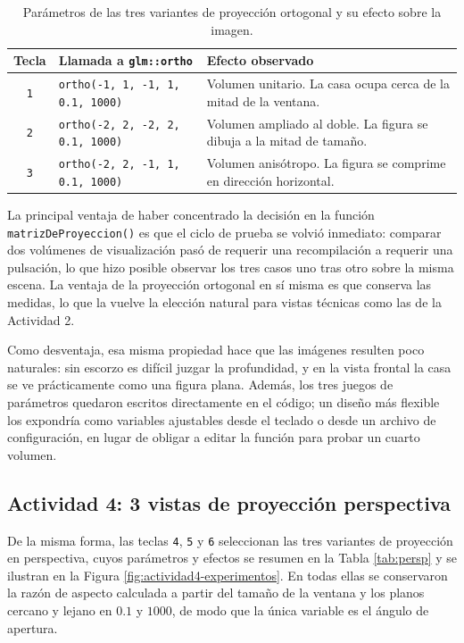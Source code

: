 \begin{table}[H]
\centering
\begin{tabular}{@{}cp{7.2cm}p{5.6cm}@{}}
\toprule
\textbf{Tecla} & \textbf{Llamada a \texttt{glm::ortho}} & \textbf{Efecto observado} \\
\midrule
\texttt{1} & \texttt{ortho(-1, 1, -1, 1, 0.1, 1000)}  & Volumen unitario. La casa ocupa cerca de la mitad de la ventana. \\
\texttt{2} & \texttt{ortho(-2, 2, -2, 2, 0.1, 1000)}  & Volumen ampliado al doble. La figura se dibuja a la mitad de tamaño. \\
\texttt{3} & \texttt{ortho(-2, 2, -1, 1, 0.1, 1000)}  & Volumen anisótropo. La figura se comprime en dirección horizontal. \\
\bottomrule
\end{tabular}
\caption{Parámetros de las tres variantes de proyección ortogonal y su efecto sobre la imagen.}
\label{tab:ortho}
\end{table}

La principal ventaja de haber concentrado la decisión en la función
\texttt{matrizDeProyeccion()} es que el ciclo de prueba se volvió inmediato:
comparar dos volúmenes de visualización pasó de requerir una recompilación a
requerir una pulsación, lo que hizo posible observar los tres casos uno tras
otro sobre la misma escena. La ventaja de la proyección ortogonal en sí misma
es que conserva las medidas, lo que la vuelve la elección natural para vistas
técnicas como las de la Actividad 2.

Como desventaja, esa misma propiedad hace que las imágenes resulten poco
naturales: sin escorzo es difícil juzgar la profundidad, y en la vista frontal
la casa se ve prácticamente como una figura plana. Además, los tres juegos de
parámetros quedaron escritos directamente en el código; un diseño más flexible
los expondría como variables ajustables desde el teclado o desde un archivo de
configuración, en lugar de obligar a editar la función para probar un cuarto
volumen.

\subsection{Actividad 4: 3 vistas de proyección perspectiva}
De la misma forma, las teclas \texttt{4}, \texttt{5} y \texttt{6} seleccionan
las tres variantes de proyección en perspectiva, cuyos parámetros y efectos se
resumen en la Tabla \ref{tab:persp} y se ilustran en la Figura
\ref{fig:actividad4-experimentos}. En todas ellas se conservaron la razón de
aspecto calculada a partir del tamaño de la ventana y los planos cercano y
lejano en $0.1$ y $1000$, de modo que la única variable es el ángulo de
apertura.

